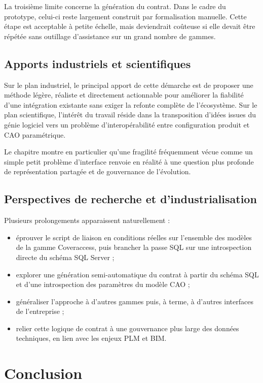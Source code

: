 La troisième limite concerne la génération du contrat. Dans le cadre du prototype, celui-ci reste largement construit par formalisation manuelle. Cette étape est acceptable à petite échelle, mais deviendrait coûteuse si elle devait être répétée sans outillage d'assistance sur un grand nombre de gammes.

\subsection{Apports industriels et scientifiques}

Sur le plan industriel, le principal apport de cette démarche est de proposer une méthode légère, réaliste et directement actionnable pour améliorer la fiabilité d'une intégration existante sans exiger la refonte complète de l'écosystème. Sur le plan scientifique, l'intérêt du travail réside dans la transposition d'idées issues du génie logiciel vers un problème d'interopérabilité entre configuration produit et CAO paramétrique.

Le chapitre montre en particulier qu'une fragilité fréquemment vécue comme un simple \og petit problème d'interface \fg{} renvoie en réalité à une question plus profonde de représentation partagée et de gouvernance de l'évolution.

\subsection{Perspectives de recherche et d'industrialisation}

Plusieurs prolongements apparaissent naturellement :

\begin{itemize}[leftmargin=1.4cm]
\item éprouver le script de liaison en conditions réelles sur l'ensemble des modèles de la gamme Coveraccess, puis brancher la passe SQL sur une introspection directe du schéma SQL Server ;
\item explorer une génération semi-automatique du contrat à partir du schéma SQL et d'une introspection des paramètres du modèle CAO ;
\item généraliser l'approche à d'autres gammes puis, à terme, à d'autres interfaces de l'entreprise ;
\item relier cette logique de contrat à une gouvernance plus large des données techniques, en lien avec les enjeux PLM et BIM.
\end{itemize}

\section{Conclusion}

